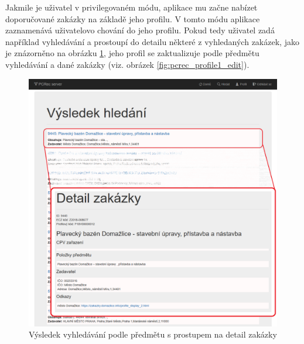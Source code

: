 \documentclass[thesis=M,czech]{FITthesis}[2019/12/23]
\begin{document}
Jakmile je uživatel v privilegovaném módu, aplikace mu začne nabízet doporučované zakázky na základě jeho profilu. V tomto módu aplikace zaznamenává uživatelovo chování do jeho profilu. Pokud tedy uživatel zadá například vyhledávání  a prostoupí do detailu některé z vyhledaných zakázek, jako je znázorněno na obrázku \ref{fig:pcrec_search_result_edit}, jeho profil se zaktualizuje podle předmětu vyhledávání a dané zakázky (viz. obrázek \ref{fig:pcrec_profile1_edit}).
\begin{figure}\centering
	\includegraphics[width=\textwidth]{images/pcrec/pcrec_search_result_edit3.png}
	\caption{Výsledek vyhledávání podle předmětu  s prostupem na detail zakázky}\label{fig:pcrec_search_result_edit}
\end{figure}
\end{document}
